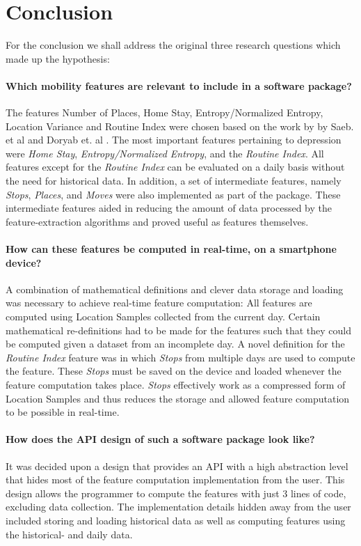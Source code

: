 \chapter{Conclusion}
\label{chapter:08}

For the conclusion we shall address the original three research questions which made up the hypothesis:

\subsubsection*{Which mobility features are relevant to include in a software package?}
The features Number of Places, Home Stay, Entropy/Normalized Entropy, Location Variance and Routine Index were chosen based on the work by by Saeb. et al \cite{Saeb2015} and Doryab et. al \cite{extraction-of-behavioural-features}. The most important features pertaining to depression were \textit{Home Stay}, \textit{Entropy/Normalized Entropy}, and the \textit{Routine Index}. All features except for the \textit{Routine Index} can be evaluated on a daily basis without the need for historical data. In addition, a set of intermediate features, namely \textit{Stops}, \textit{Places}, and \textit{Moves} were also implemented as part of the package. These intermediate features aided in reducing the amount of data processed by the feature-extraction algorithms and proved useful as features themselves.

\subsubsection*{How can these features be computed in real-time, on a smartphone device?}
A combination of mathematical definitions and clever data storage and loading was necessary to achieve real-time feature computation: All features are computed using Location Samples collected from the current day. Certain mathematical re-definitions had to be made for the features such that they could be computed given a dataset from an incomplete day. A novel definition for the \textit{Routine Index} feature was in which \textit{Stops} from multiple days are used to compute the feature. These \textit{Stops} must be saved on the device and loaded whenever the feature computation takes place. \textit{Stops} effectively work as a compressed form of Location Samples and thus reduces the storage and allowed feature computation to be possible in real-time.

\subsubsection*{How does the API design of such a software package look like?}
It was decided upon a design that provides an API with a high abstraction level that hides most of the feature computation implementation from the user. This design allows the programmer to compute the features with just 3 lines of code, excluding data collection. The implementation details hidden away from the user included storing and loading historical data as well as computing features using the historical- and daily data. 

